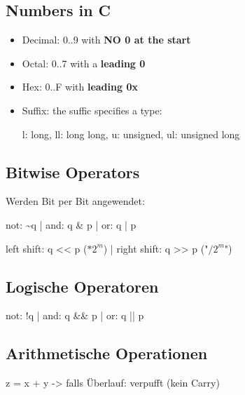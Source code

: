\begin{multicols*}{4}
\subsection{Numbers in C}
\begin{itemize}
    \item Decimal: 0..9 with \textbf{NO 0 at the start}
    \item Octal: 0..7 with a \textbf{leading 0}
    \item Hex: 0..F with \textbf{leading 0x}
    \item Suffix: the suffic specifies a type:

    l: long, ll: long long, u: unsigned, ul: unsigned long
\end{itemize}

\subsection{Bitwise Operators}
Werden Bit per Bit angewendet:

not: \~{}q | and: q \& p | or: q | p

left shift: q << p ($* 2^m$) | right shift: q >> p ("$/ 2^m$")
\subsection{Logische Operatoren}
not: !q | and: q \&\& p | or: q || p

\subsection{Arithmetische Operationen}
z = x + y -> falls Überlauf: verpufft (kein Carry)

\end{multicols*}

